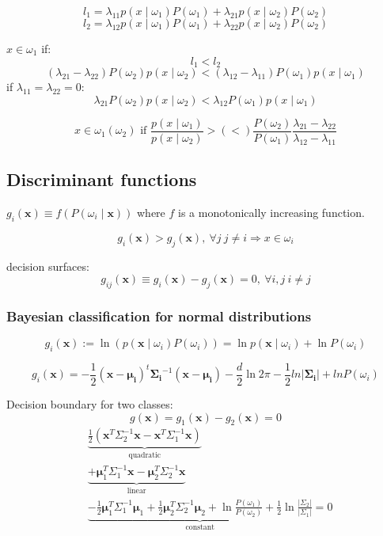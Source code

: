 \documentclass{article}
\begin{document}
\begin{multicols}{2}
\[l_1 = \lambda_{11} p(x \mid \omega_1)P(\omega_1) + \lambda_{21} p(x \mid \omega_2)P(\omega_2)\]
\[l_2 = \lambda_{12} p(x \mid \omega_1)P(\omega_1) + \lambda_{22} p(x \mid \omega_2)P(\omega_2)\]

$x \in \omega_1$ if:
\[l_1 < l_2\]
\[(\lambda_{21}-\lambda_{22}) P(\omega_2) p(x \mid \omega_2) < (\lambda_{12}-\lambda_{11}) P(\omega_1) p(x \mid \omega_1)\]
if $\lambda_{11} = \lambda_{22} = 0$:
\[\lambda_{21} P(\omega_2) p(x \mid \omega_2) < \lambda_{12} P(\omega_1) p(x \mid \omega_1)\]

\[x \in \omega_1 (\omega_2) \text{ if } \frac{p(x \mid \omega_1)}{p(x \mid \omega_2)} > (<) \frac{P(\omega_2)}{P(\omega_1)}\frac{\lambda_{21}-\lambda_{22}}{\lambda_{12}-\lambda_{11}}\]

\subsection{Discriminant functions}
$g_i (\symbf{x}) \equiv f(P(\omega_i \mid \symbf{x}))$ where $f$ is a monotonically increasing function.

\[g_i(\symbf{x}) > g_j(\symbf{x}),\ \forall j\ j \neq i \Rightarrow x \in \omega_i\]

decision surfaces:
\[g_{ij}(\symbf{x}) \equiv g_i(\symbf{x}) - g_j(\symbf{x}) = 0,\ \forall i, j\ i \neq j\]

\subsubsection*{Bayesian classification for normal distributions}

\[g_i(\symbf{x}) := \ln (p(\symbf{x} \mid \omega_i) P(\omega_i)) = \ln p(\symbf{x} \mid \omega_i) + \ln P(\omega_i)\]

\[g_i(\symbf{x}) = -\frac{1}{2} (\symbf{x} - \symbf{\mu_i})^t \symbf{\Sigma_i}^{-1} (\symbf{x} - \symbf{\mu_i}) - \frac{d}{2}\ln2\pi - \frac{1}{2} ln |\symbf{\Sigma_i}| + ln P(\omega_i)\]

Decision boundary for two classes:
\[g(\symbf{x}) = g_1(\symbf{x}) - g_2(\symbf{x}) = 0\]
\[\begin{split}
	&\underbrace{\frac{1}{2} \left( \symbf{x}^T \Sigma_2^{-1} \symbf{x} - \symbf{x}^T \Sigma_1^{-1} \symbf{x} \right)}_{\text{quadratic}} \\
	&\underbrace{+ \symbf{\mu}_1^T \Sigma_1^{-1} \symbf{x} - \symbf{\mu}_2^T \Sigma_2^{-1} \symbf{x}}_{\text{linear}} \\
	&\underbrace{- \frac{1}{2} \symbf{\mu}_1^T \Sigma_1^{-1} \symbf{\mu}_1 + \frac{1}{2} \symbf{\mu}_2^T \Sigma_2^{-1} \symbf{\mu}_2 + \ln \frac{P(\omega_1)}{P(\omega_2)} + \frac{1}{2} \ln \frac{|\Sigma_2|}{|\Sigma_1|}}_{\text{constant}} = 0
\end{split}\]


\end{multicols}
\end{document}
